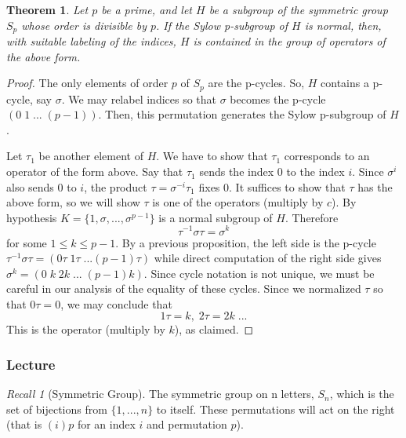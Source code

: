 \documentclass[12pt]{article}
\newtheorem{thm}{Theorem}[section]
\theoremstyle{definition}
\theoremstyle{remark}
\newtheorem*{rec}{Recall}
\numberwithin{equation}{section}
\begin{document}
\begin{thm}
        Let $p$ be a prime, and let $H$ be a subgroup of the symmetric group $S_p$ whose order is divisible by $p$. If the Sylow p-subgroup of $H$ is normal, then, with suitable labeling of the indices, $H$ is contained in the group of operators of the above form.
\end{thm}
\begin{proof}
        The only elements of order $p$ of $S_p$ are the p-cycles. So, $H$ contains a p-cycle, say $\sigma$. We may relabel indices so that $\sigma$ becomes the p-cycle $(0\;1\;...\;(p-1))$. Then, this permutation generates the Sylow p-subgroup of $H$.


        Let $\tau_1$ be another element of $H$. We have to show that $\tau_1$ corresponds to an operator of the form above. Say that $\tau_1$ sends the index $0$ to the index $i$. Since $\sigma^i$ also sends $0$ to $i$, the product $\tau=\sigma^{-i}\tau_1$ fixes $0$. It suffices to show that $\tau$ has the above form, so we will show $\tau$ is one of the operators (multiply by $c$). By hypothesis $K = \{1,\sigma,...,\sigma^{p-1}\}$ is a normal subgroup of $H$. Therefore \begin{equation}
                \tau^{-1}\sigma\tau = \sigma^k
        \end{equation}
        for some $1 \leq k \leq p-1$. By a previous proposition, the left side is the p-cycle $\tau^{-1}\sigma\tau = (0\tau\;1\tau\;...(p-1)\tau)$ while direct computation of the right side gives $\sigma^k = (0\;k\;2k\;...\;(p-1)k)$. Since cycle notation is not unique, we must be careful in our analysis of the equality of these cycles. Since we normalized $\tau$ so that $0\tau = 0$, we may conclude that \begin{equation}
                1\tau = k,\;2\tau = 2k\;...
        \end{equation}
        This is the operator (multiply by $k$), as claimed.
\end{proof}


\vspace{15pt}





\subsubsection{Lecture}


\begin{rec}[Symmetric Group]
        The symmetric group on n letters, $S_n$, which is the set of bijections from $\{1,...,n\}$ to itself. These permutations will act on the right (that is $(i)p$ for an index $i$ and permutation $p$). 
\end{rec}
\end{document}
